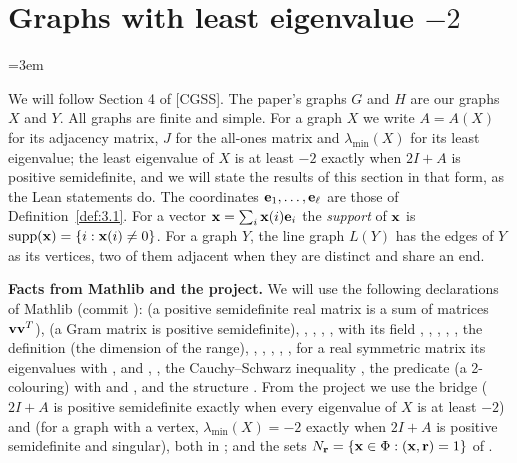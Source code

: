 \section{Graphs with least eigenvalue \texorpdfstring{$-2$}{-2}}\label{sec:4}
\begingroup
\emergencystretch=3em

We will follow Section 4 of [CGSS]. The paper's graphs $G$ and $H$ are our graphs $X$ and $Y$.
All graphs are finite and simple. For a graph $X$ we write $A=A(X)$ for its adjacency matrix,
$J$ for the all-ones matrix and $\lambda_{\min}(X)$ for its least eigenvalue; the least
eigenvalue of $X$ is at least $-2$ exactly when $2I+A$ is positive semidefinite, and we will
state the results of this section in that form, as the Lean statements do. The coordinates
${\mathbf e}_1,\dots,{\mathbf e}_\ell$ are those of Definition~\ref{def:3.1}. For a vector
${\mathbf x}=\sum_i{\mathbf x}(i){\mathbf e}_i$ the \emph{support} of ${\mathbf x}$ is $\mathop{\mathrm{supp}}\nolimits({\mathbf x})=\{i:{\mathbf x}(i)\ne0\}$. For a graph $Y$,
the line graph $L(Y)$ has the edges of $Y$ as its vertices, two of them adjacent when they are
distinct and share an end.

\begingroup\raggedright
\medskip\noindent\textbf{Facts from Mathlib and the project.}\label{facts:sec4}
We will use the following declarations of Mathlib (commit ):
 (a positive semidefinite real matrix is a sum of
matrices ${\mathbf v}{\mathbf v}^T$),  (a Gram matrix is positive semidefinite),
, ,
, , 
with its field ,
,
,
, , the
definition  (the dimension of the range), ,
, ,
, , for a
real symmetric matrix its eigenvalues  with
, 
and , , the
Cauchy--Schwarz inequality , the predicate
 (a 2-colouring) with
 and
, and the structure
. From the
project we use the bridge  ($2I+A$ is
positive semidefinite exactly when every eigenvalue of $X$ is at least $-2$) and
 (for a graph with a vertex,
$\lambda_{\min}(X)=-2$ exactly when $2I+A$ is positive semidefinite and singular), both in
; and the sets
$N_{\mathbf r}=\{{\mathbf x}\in\Phi:({\mathbf x},{\mathbf r})=1\}$ of .
\par
\endgroup


